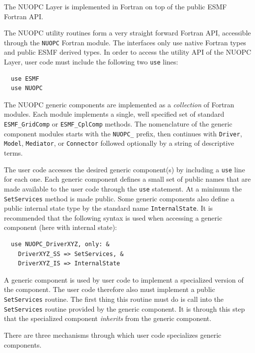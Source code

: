 
The NUOPC Layer is implemented in Fortran on top of the public ESMF Fortran API.

The NUOPC utility routines form a very straight forward Fortran API, accessible through the {\tt NUOPC} Fortran module. The interfaces only use native Fortran types and public ESMF derived types. In order to access the utility API of the NUOPC Layer, user code must include the following two {\tt use} lines:

\begin{verbatim}
  use ESMF
  use NUOPC
\end{verbatim}

The NUOPC generic components are implemented as a {\em collection} of Fortran modules. Each module implements a single, well specified set of standard {\tt ESMF\_GridComp} or {\tt ESMF\_CplComp} methods. The nomenclature of the generic component modules starts with the {\tt NUOPC\_} prefix, then continues with {\tt Driver}, {\tt Model}, {\tt Mediator}, or {\tt Connector} followed optionally by a string of descriptive terms.

The user code accesses the desired generic component(s) by including a {\tt use} line for each one. Each generic component defines a small set of public names that are made available to the user code through the {\tt use} statement. At a minimum the {\tt SetServices} method is made public. Some generic components also define a public internal state type by the standard name {\tt InternalState}. It is recommended that the following syntax is used when accessing a generic component (here with internal state):

\begin{verbatim}
  use NUOPC_DriverXYZ, only: &
    DriverXYZ_SS => SetServices, &
    DriverXYZ_IS => InternalState
\end{verbatim}

A generic component is used by user code to implement a specialized version of the component. The user code therefore also must implement a public {\tt SetServices} routine. The first thing this routine must do is call into the {\tt SetServices} routine provided by the generic component. It is through this step that the specialized component {\em inherits} from the generic component.

There are three mechanisms through which user code specializes generic components.

